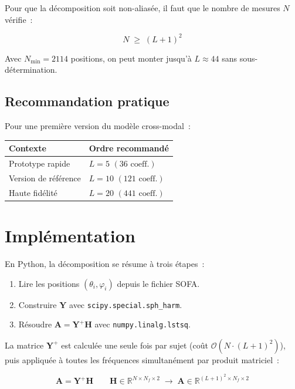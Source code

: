 \documentclass[12pt, a4paper]{article}
\begin{document}
Pour que la décomposition soit non-aliasée, il faut que le nombre de mesures
$N$ vérifie~:

\begin{equation}
    N \;\geq\; (L+1)^2
\end{equation}

Avec $N_\mathrm{min} = 2114$ positions, on peut monter jusqu'à $L \approx 44$
sans sous-détermination.

\subsection{Recommandation pratique}

Pour une première version du modèle cross-modal~:

\begin{center}
\begin{tabular}{ll}
\toprule
Contexte & Ordre recommandé \\
\midrule
Prototype rapide      & $L = 5$  $(36 \text{ coeff.})$ \\
Version de référence  & $L = 10$ $(121 \text{ coeff.})$ \\
Haute fidélité        & $L = 20$ $(441 \text{ coeff.})$ \\
\bottomrule
\end{tabular}
\end{center}

\section{Implémentation}

En Python, la décomposition se résume à trois étapes~:

\begin{enumerate}
    \item Lire les positions $(\theta_i, \varphi_i)$ depuis le fichier SOFA.
    \item Construire $\mathbf{Y}$ avec \texttt{scipy.special.sph\_harm}.
    \item Résoudre $\mathbf{A} = \mathbf{Y}^+ \mathbf{H}$ avec
          \texttt{numpy.linalg.lstsq}.
\end{enumerate}

La matrice $\mathbf{Y}^+$ est calculée une seule fois par sujet (coût
$\mathcal{O}(N \cdot (L+1)^2)$), puis appliquée à toutes les fréquences
simultanément par produit matriciel~:

\begin{equation}
    \mathbf{A} = \mathbf{Y}^+ \mathbf{H}
    \qquad
    \mathbf{H} \in \mathbb{R}^{N \times N_f \times 2}
    \;\longrightarrow\;
    \mathbf{A} \in \mathbb{R}^{(L+1)^2 \times N_f \times 2}
\end{equation}
\end{document}
